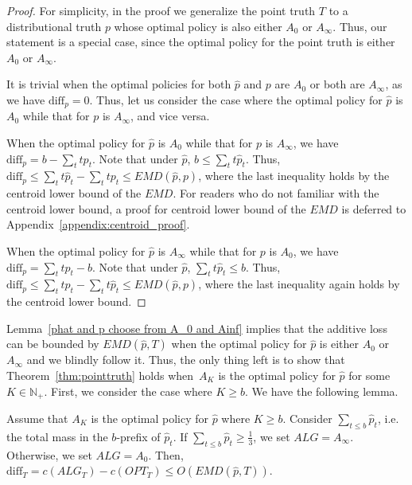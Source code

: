 \begin{proof}
    For simplicity, in the proof we generalize the point truth $T$ to a distributional truth $p$ whose optimal policy is also either $A_0$ or $A_\infty$. Thus, our statement is a special case, since the optimal policy for the point truth is either $A_0$ or $A_\infty$.
    
    It is trivial when the optimal policies for both $\hat{p}$ and $p$ are $A_0$ or both are $A_\infty$, as we have $\text{diff}_p = 0$. Thus, let us consider the case where the optimal policy for $\hat{p}$ is $A_0$ while that for $p$ is $A_\infty$, and vice versa.  

    When the optimal policy for $\hat{p}$ is $A_0$ while that for $p$ is $A_\infty$, we have $\text{diff}_p = b - \sum_{t} tp_t$. Note that under $\hat{p}$, $b \leq \sum_{t} t \hat{p}_t$. Thus, $\text{diff}_p \leq \sum_{t} t \hat{p}_t - \sum_{t} tp_t \leq EMD(\hat{p},p)$, where the last inequality holds by the centroid lower bound of the $EMD$. For readers who do not familiar with the centroid lower bound, a proof for centroid lower bound of the $EMD$ is deferred to Appendix~\ref{appendix:centroid_proof}.

    When the optimal policy for $\hat{p}$ is $A_\infty$ while that for $p$ is $A_0$, we have $\text{diff}_p = \sum_{t} tp_t - b$. Note that under $\hat{p}$, $\sum_{t} t \hat{p}_t \leq b$. Thus, $\text{diff}_p \leq \sum_{t} tp_t - \sum_{t} t \hat{p}_t \leq EMD(\hat{p},p)$, where the last inequality again holds by the centroid lower bound.
\end{proof}

Lemma~\ref{phat and p choose from A_0 and Ainf} implies that the additive loss can be bounded by $EMD(\hat{p},T)$ when the optimal policy for $\hat{p}$ is either $A_0$ or $A_\infty$ and we blindly follow it. Thus, the only thing left is to show that Theorem~\ref{thm:pointtruth} holds when~$A_K$ is the optimal policy for $\hat{p}$ for some $K \in \mathbb{N}_+$. First, we consider the case where $K \geq b$. We have the following lemma.

\begin{lemma}
    \label{when K>=b}
    Assume that $A_K$ is the optimal policy for $\hat{p}$ where $K \geq b$. Consider $\sum_{t \leq b} \hat{p}_t$, i.e. the total mass in the $b$-prefix of $\hat{p}_t$. If $\sum_{t \leq b} \hat{p}_t \geq \frac{1}{3}$, we set $ALG=A_\infty$. Otherwise, we set $ALG=A_0$. Then, $\text{diff}_T = c(ALG_T)-c(OPT_T) \leq O(EMD(\hat{p},T))$.
\end{lemma}

